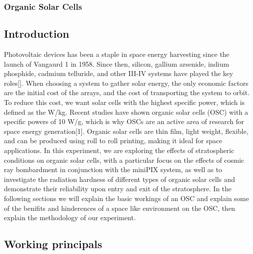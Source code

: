 \subsubsection{Organic Solar Cells}

	\subsection{Introduction}
	Photovoltaic devices has been a staple in space energy harvesting since the launch of Vangaurd 1 in 1958. Since then, silicon, gallium arsenide, indium phosphide, cadmium telluride, and other III-IV systems have played the key roles[]. When choosing a system to gather solar energy, the only economic factors are the initial cost of the arrays, and the cost of transporting the system to orbit. To reduce this cost, we want solar cells with the highest specific power, which is defined as the W/kg. Recent studies have shown organic solar cells (OSC) with a specific powers of 10 W/g, which is why OSCs are an active area of research for space energy generation[1]. Organic solar cells are thin film, light weight, flexible, and can be produced using roll to roll printing, making it ideal for space applications. In this experiment, we are exploring the effects of stratospheric conditions on organic solar cells, with a particular focus on the effects of cosmic ray bombardment in conjunction with the miniPIX system, as well as to investigate the radiation hardness of different types of organic solar cells and demonstrate their reliability upon entry and exit of the stratosphere. In the following sections we will explain the basic workings of an OSC and explain some of the benifits and hinderences of a space like environment on the OSC, then explain the methodology of our experiment.
	
	\subsection{Working principals}

